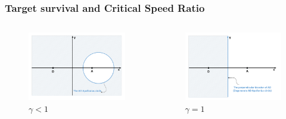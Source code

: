 \documentclass{beamer}
\begin{document}
\begin{frame}
\frametitle{Target survival and Critical Speed Ratio}

\begin{columns}[c]
	\begin{column}{.3\linewidth}
		\begin{figure}[H]
			\centering
			\includegraphics[scale = 0.12]{fig/drawing4_1a.pdf}
			\caption{$\gamma<1$}
		\end{figure}
	\end{column}
	
	\begin{column}{.3\linewidth}
		\begin{figure}[H]
			\centering
			\includegraphics[scale = 0.12]{fig/drawing4_1b.pdf}
			\caption{$\gamma=1$}
		\end{figure}
		

\end{column}
\end{columns}
\end{frame}
\end{document}
